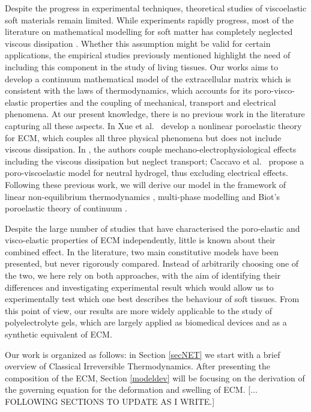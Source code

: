 Despite the progress in experimental techniques, theoretical studies of viscoelastic soft materials remain limited. While experiments rapidly progress, most of the literature on mathematical modelling for soft matter has completely neglected viscous dissipation \cite{Article1}. Whether this assumption might be valid for certain applications, the empirical studies previously mentioned highlight the need of including this component in the study of living tissues. Our works aims to develop a continuum mathematical model of the extracellular matrix which is consistent with the laws of thermodynamics, which accounts for its poro-visco-elastic properties and the coupling of mechanical, transport and electrical phenomena. At our present knowledge, there is no previous work in the literature capturing all these aspects. In \cite{ecm1,ecm2} Xue et al.~ develop a nonlinear poroelastic theory for ECM, which couples all three physical phenomena but does not include viscous dissipation. In \cite{Jeru}, the authors couple mechano-electrophysiological effects including the viscous dissipation but neglect transport; Caccavo et al.~ \cite{Article1} propose a poro-viscoelastic model for neutral hydrogel, thus excluding electrical effects.  Following these previous work, we will derive our model in the framework of linear non-equilibrium thermodynamics \cite{NET}, multi-phase modelling and Biot's poroelastic theory of continuum \cite{Biot}. 

Despite the large number of studies that have characterised the poro-elastic and visco-elastic properties of ECM independently, little is known about their combined effect. In the literature, two main constitutive models have been presented, but never rigorously compared.  Instead of arbitrarily choosing one of the two, we here rely on both approaches, with the aim of identifying their differences and investigating experimental result which would allow us to experimentally test which one best describes the behaviour of soft tissues. From this point of view, our results are more widely applicable to the study of polyelectrolyte gels, which are largely applied as biomedical devices and as a synthetic equivalent of ECM.

Our work is organized as follows: in Section \ref{secNET} we start with a brief overview of Classical Irreversible Thermodynamics. After presenting the composition of the ECM, Section \ref{modeldev} will be focusing on the derivation of the governing equation for the deformation and swelling of ECM. [... FOLLOWING SECTIONS TO UPDATE AS I WRITE.]